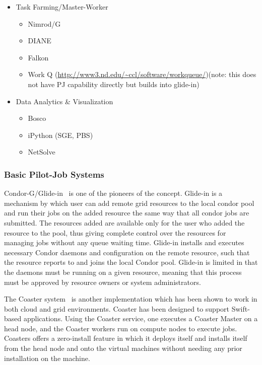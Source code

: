 \documentclass{sig-alternate}
\begin{document}
\begin{itemize}
\begin{itemize}
\begin{itemize}
		\end{itemize}
		\item Task Farming/Master-Worker
		\begin{itemize}
			\item Nimrod/G 
			\item DIANE
			\item Falkon 
            \item Work Q (\url{http://www3.nd.edu/~ccl/software/workqueue/})(note: this does not have PJ capability directly but builds into glide-in)
		\end{itemize}
		\item Data Analytics \& Visualization
		\begin{itemize}
			\item Bosco
			\item iPython (SGE, PBS)
			\item NetSolve~\cite{Casanova:1995:NNS:898848}
		\end{itemize}		
	\end{itemize}
\end{itemize}

\subsubsection{Basic Pilot-Job Systems}
Condor-G/Glide-in~\cite{condor-g} is one of the pioneers of the \pilotjob
concept. Glide-in is a mechanism by which user can add remote grid resources
to the local condor pool and run their jobs on the added resource the same way
that all condor jobs are submitted. The resources added are available only for
the user who added the resource to the pool, thus giving complete control over
the resources for managing jobs without any queue waiting time. Glide-in
installs and executes necessary Condor daemons and configuration on the remote
resource, such that the resource reports to and joins the local Condor pool.
Glide-in is limited in that the daemons must be running on a given resource,
meaning that this process must be approved by resource owners or system
administrators.

The Coaster system~\cite{coasters} is another \pilotjob implementation
which has been shown to work in both cloud and grid
environments. Coaster has been designed to support Swift-based applications. 
Using the Coaster service, one executes a Coaster Master
on a head node, and the Coaster workers run on compute nodes to
execute jobs. Coasters offers a zero-install feature in which it
deploys itself and installs itself from the head node and onto the
virtual machines without needing any prior installation on the
machine. 
\end{document}

